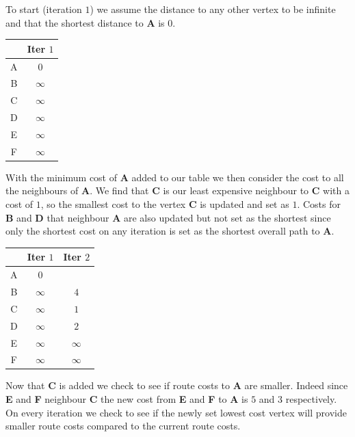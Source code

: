 \documentclass{article}
\begin{document}
To start (iteration $1$) we assume the distance to any other vertex to be infinite and that the shortest distance to {\bf A} is $0$.

\begin{center}
 \begin{tabular}{| c || c |} 
 \hline
 \, & Iter $1$ \\ [0.5ex] 
 \hline\hline
A & $0$ \\ 
 \hline
B & $\infty$ \\
 \hline
C & $\infty$ \\
 \hline
D & $\infty$ \\
 \hline
E & $\infty$ \\
 \hline
F & $\infty$ \\
 \hline
\end{tabular}
\end{center}

With the minimum cost of {\bf A} added to our table we then consider the cost to all the neighbours of {\bf A}. We find that {\bf C} is our least expensive neighbour to {\bf C} with a cost of $1$, so the smallest cost to the vertex {\bf C} is updated and set as $1$. Costs for {\bf B} and {\bf D} that neighbour {\bf A} are also updated but not set as the shortest since only the shortest cost on any iteration is set as the shortest overall path to {\bf A}.

\begin{center}
 \begin{tabular}{| c || c | c |} 
 \hline
 \, & Iter $1$ & Iter $2$ \\ [0.5ex] 
 \hline\hline
A & $0$ & \, \\ 
 \hline
B & $\infty$ & $4$ \\
 \hline
C & $\infty$ & $1$ \\
 \hline
D & $\infty$ & $2$ \\
 \hline
E & $\infty$ & $\infty$ \\
 \hline
F & $\infty$ & $\infty$ \\
 \hline
\end{tabular}
\end{center}

Now that {\bf C} is added we check to see if route costs to {\bf A} are smaller. Indeed since {\bf E} and {\bf F} neighbour {\bf C} the new cost from {\bf E} and {\bf F} to {\bf A} is $5$ and $3$ respectively. On every iteration we check to see if the newly set lowest cost vertex will provide smaller route costs compared to the current route costs.
\end{document}
